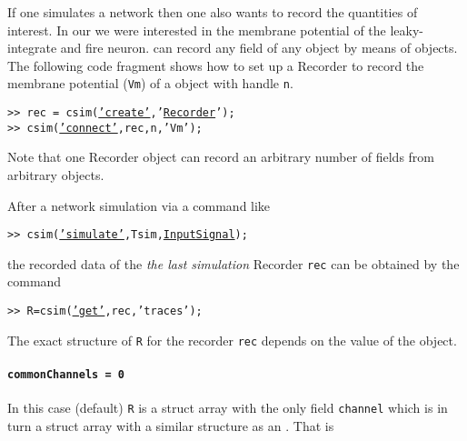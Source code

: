 
If one simulates a network then one also wants to record the
quantities of interest. In our  we were interested in the membrane potential of the
leaky-integrate and fire neuron. \csim can record any field of any
object by means of  objects. The
following code fragment shows how to set up a Recorder to record the
membrane potential (\texttt{Vm}) of a
 object with handle \texttt{n}.
%
\begin{tabbing}
\quad\texttt{>> rec = csim(\hyperlink{cmd:create}{'create'},'\hyperlink{classRecorder}{Recorder}');} \\
\quad\texttt{>> csim(\hyperlink{cmd:connect}{'connect'},rec,n,'Vm');}
\end{tabbing}
%
Note that one Recorder object can record an arbitrary number of
fields from arbitrary objects.


After a network simulation via a command like
%
\begin{tabbing}
\quad\texttt{>> csim(\hyperlink{cmd:simulate}{'simulate'},Tsim,\hyperlink{sec:input}{InputSignal});}
\end{tabbing}
%
the recorded data of the \emph{the last simulation} Recorder
\texttt{rec} can be obtained by the command
\begin{tabbing}
\quad\texttt{>> R=csim(\hyperlink{cmd:get}{'get'},rec,'traces');}
\end{tabbing}
The exact structure of \texttt{R} for the recorder \texttt{rec}
depends on the value of the  object.


\paragraph{\texttt{commonChannels = 0}} In this case  (default) \texttt{R}
is a struct array with the only field \texttt{channel} which is in
turn a struct array with a similar structure as an
. That is


